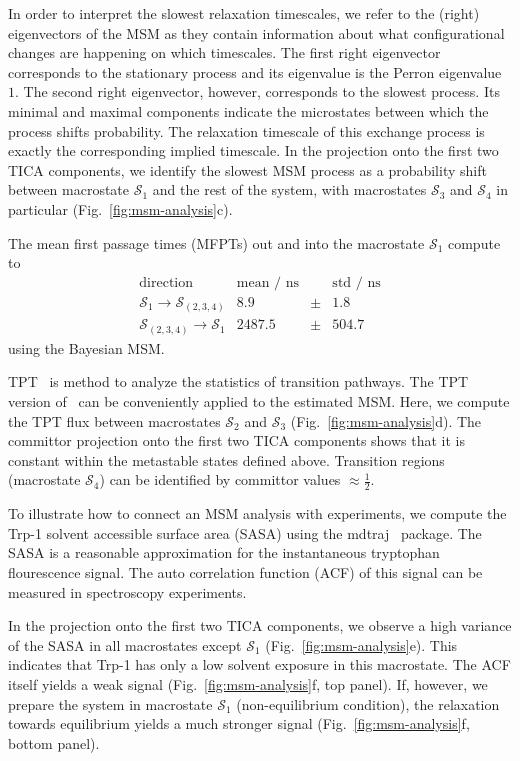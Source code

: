 \documentclass[9pt,tutorial]{livecoms}
\begin{document}
In order to interpret the slowest relaxation timescales, we refer to the (right) eigenvectors of the MSM as they contain information about what configurational changes are happening on which timescales.
The first right eigenvector corresponds to the stationary process and its eigenvalue is the Perron eigenvalue $1$.
The second right eigenvector, however, corresponds to the slowest process.
Its minimal and maximal components indicate the microstates between which the process shifts probability.
The relaxation timescale of this exchange process is exactly the corresponding implied timescale.
In the projection onto the first two TICA components, we identify the slowest MSM process as a probability shift between macrostate $\mathcal{S}_1$ and the rest of the system, with macrostates $\mathcal{S}_3$ and $\mathcal{S}_4$ in particular (Fig.~\ref{fig:msm-analysis}c).

The mean first passage times (MFPTs) out and into the macrostate $\mathcal{S}_1$ compute to
\[ \begin{array}{crcr}
\textrm{direction} & \textrm{mean / ns} && \textrm{std / ns} \\
\hline
\mathcal{S}_1 \to \mathcal{S}_{(2,3,4)} & 8.9 & \pm & 1.8 \\
\mathcal{S}_{(2,3,4)} \to \mathcal{S}_1 & 2487.5 & \pm &  504.7
\end{array}\]
using the Bayesian MSM.

TPT~\cite{weinan-tpt,metzner-msm-tpt} is method to analyze the statistics of transition pathways. The TPT version of~\cite{noe-folding-pathways} can be conveniently applied to the estimated MSM. Here, we compute the TPT flux between macrostates $\mathcal{S}_2$ and $\mathcal{S}_3$ (Fig.~\ref{fig:msm-analysis}d).
The committor projection onto the first two TICA components shows that it is constant within the metastable states defined above.
Transition regions (macrostate $\mathcal{S}_4$) can be identified by committor values $\approx \frac{1}{2}$.

To illustrate how to connect an MSM analysis with experiments, we compute the Trp-1 solvent accessible surface area (SASA) using the mdtraj~\cite{mdtraj} package.
The SASA is a reasonable approximation for the instantaneous tryptophan flourescence signal.
The auto correlation function (ACF) of this signal can be measured in spectroscopy experiments.

In the projection onto the first two TICA components, we observe a high variance of the SASA in all macrostates except $\mathcal{S}_1$ (Fig.~\ref{fig:msm-analysis}e).
This indicates that Trp-1 has only a low solvent exposure in this macrostate.
The ACF itself yields a weak signal (Fig.~\ref{fig:msm-analysis}f, top panel).
If, however, we prepare the system in macrostate $\mathcal{S}_1$ (non-equilibrium condition), the relaxation towards equilibrium yields a much stronger signal (Fig.~\ref{fig:msm-analysis}f, bottom panel).
\end{document}
